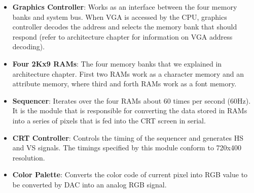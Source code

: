 \documentclass[oneside]{book}
\begin{document}
\begin{itemize}

\item \textbf{Graphics Controller}: Works as an interface between
the four memory banks and system bus. When VGA is accessed by the CPU,
graphics controller decodes the address and selects the memory bank
that should respond (refer to architecture chapter for information
on VGA address decoding).

\item \textbf{Four 2Kx9 RAMs}: The four memory banks that we explained
in architecture chapter. First two RAMs work as a character memory
and an attribute memory, where third and forth RAMs work as a font
memory.

\item \textbf{Sequencer}: Iterates over the four RAMs about 60 times
per second (60Hz). It is the module that is responsible for converting
the data stored in RAMs into a series of pixels that is fed
into the CRT screen in serial.

\item \textbf{CRT Controller}: Controls the timing of the sequencer
and generates HS and VS signals. The timings specified by this module
conform to 720x400 resolution.

\item \textbf{Color Palette}: Converts the color code of current pixel
into RGB value to be converted by DAC into an analog RGB signal.

\end{itemize}
\end{document}
